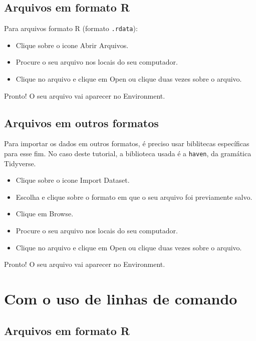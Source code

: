 \documentclass[
  brazil,
]{book}
\providecommand{\tightlist}{%
  \setlength{\itemsep}{0pt}\setlength{\parskip}{0pt}}
\begin{document}
\hypertarget{arquivos-em-formato-r}{%
\subsection{Arquivos em formato R}\label{arquivos-em-formato-r}}

Para arquivos formato R (formato \texttt{.rdata}):

\begin{itemize}
\tightlist
\item
  Clique sobre o icone Abrir Arquivos.
\item
  Procure o seu arquivo nos locais do seu computador.
\item
  Clique no arquivo e clique em Open ou clique duas vezes sobre o arquivo.
\end{itemize}

Pronto! O seu arquivo vai aparecer no Environment.

\hypertarget{arquivos-em-outros-formatos}{%
\subsection{Arquivos em outros formatos}\label{arquivos-em-outros-formatos}}

Para importar os dados em outros formatos, é preciso usar biblitecas específicas para esse fim. No caso deste tutorial, a biblioteca usada é a \texttt{haven}, da gramática Tidyverse.

\begin{itemize}
\tightlist
\item
  Clique sobre o icone Import Dataset.
\item
  Escolha e clique sobre o formato em que o seu arquivo foi previamente salvo.
\item
  Clique em Browse.
\item
  Procure o seu arquivo nos locais do seu computador.
\item
  Clique no arquivo e clique em Open ou clique duas vezes sobre o arquivo.
\end{itemize}

Pronto! O seu arquivo vai aparecer no Environment.

\hypertarget{com-o-uso-de-linhas-de-comando}{%
\section{Com o uso de linhas de comando}\label{com-o-uso-de-linhas-de-comando}}

\hypertarget{arquivos-em-formato-r-1}{%
\subsection{Arquivos em formato R}\label{arquivos-em-formato-r-1}}
\end{document}
